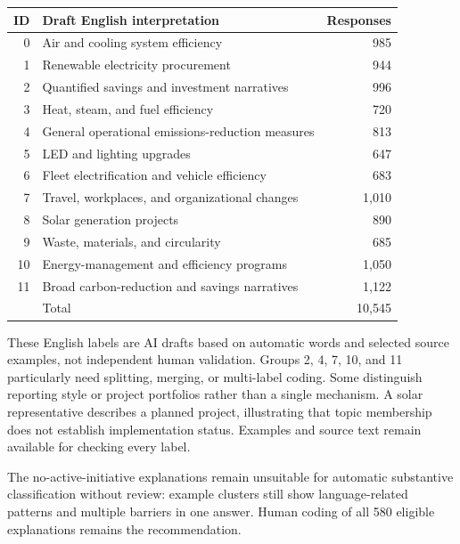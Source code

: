 \documentclass[11pt,a4paper]{article}
\begin{document}
\begin{center}
\small
\begin{tabular}{rlr}
\toprule
ID & Draft English interpretation & Responses \\
\midrule
0 & Air and cooling system efficiency & 985 \\
1 & Renewable electricity procurement & 944 \\
2 & Quantified savings and investment narratives & 996 \\
3 & Heat, steam, and fuel efficiency & 720 \\
4 & General operational emissions-reduction measures & 813 \\
5 & LED and lighting upgrades & 647 \\
6 & Fleet electrification and vehicle efficiency & 683 \\
7 & Travel, workplaces, and organizational changes & 1,010 \\
8 & Solar generation projects & 890 \\
9 & Waste, materials, and circularity & 685 \\
10 & Energy-management and efficiency programs & 1,050 \\
11 & Broad carbon-reduction and savings narratives & 1,122 \\
\midrule
 & Total & 10,545 \\
\bottomrule
\end{tabular}
\end{center}

These English labels are AI drafts based on automatic words and selected
source examples, not independent human validation. Groups 2, 4, 7, 10,
and 11 particularly need splitting, merging, or multi-label coding.
Some distinguish reporting style or project portfolios rather than a
single mechanism. A solar representative describes a planned project,
illustrating that topic membership does not establish implementation status.
Examples and source text remain available for checking every label.

The no-active-initiative explanations remain unsuitable for automatic
substantive classification without review: example clusters still show
language-related patterns and multiple barriers in one answer.
Human coding of all 580 eligible explanations remains the recommendation.
\end{document}
